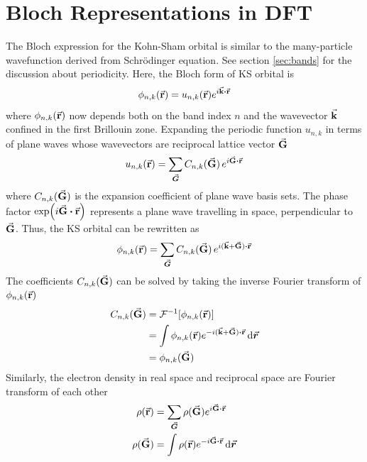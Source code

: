 \section{Bloch Representations in DFT}
The Bloch expression for the Kohn-Sham orbital is similar to the many-particle wavefunction derived from Schr\"{o}dinger equation. See section \ref{sec:bands} for the discussion about periodicity. Here, the Bloch form of KS orbital is 
\begin{equation}
    \phi_{n,k}(\va{r}) = u_{n,k} (\va{r}) e^{i \va{k} \vdot \va{r}}
\end{equation}
where $\phi_{n,k}(\va{r})$ now depends both on the band index $n$ and the wavevector $\va{k}$ confined in the first Brillouin zone. Expanding the periodic function $u_{n,k}$ in terms of plane waves whose wavevectors are reciprocal lattice vector $\va{G}$
\begin{equation}
    u_{n,k} (\va{r}) =  \sum_{\va*{G}} C_{n,k}(\va{G})\, e^{i \va{G} \vdot \va{r}}
\end{equation}
where $C_{n,k}(\va{G})$ is the expansion coefficient of plane wave basis sets. The phase factor $\exp({i \va{G} \vdot \va{r}}) $ represents a plane wave travelling in space, perpendicular to $\va{G}$. Thus, the KS orbital can be rewritten as 
\begin{equation}
    \phi_{n,k}(\va{r})  = \sum_{\va*{G}} C_{n,k}(\va{G})\, e^{i (\va{k} + \va{G} ) \vdot \va{r}}
\end{equation}
The coefficients $C_{n,k}(\va{G})$ can be solved by taking the inverse Fourier transform of $\phi_{n,k}(\va{r}) $
\begin{align}
    C_{n,k}(\va{G}) &= \mathcal{F}^{-1} [\phi_{n,k}(\va{r})] \\
            &= \int \phi_{n,k}(\va{r}) e^{- i (\va{k} + \va{G} ) \vdot \va{r}} \dd{\va*{r}} \\
            &= \phi_{n,k}(\va{G})
\end{align}
Similarly, the electron density in real space and reciprocal space are Fourier transform of each other
\begin{align}
    \rho({\va{r}}) &= \sum_{\va*{G}} \rho({\va{G}}) e^{i \va{G} \vdot \va{r}} \\
    \rho({\va{G}})  &= \int \rho({\va{r}}) e^{-i \va{G} \vdot \va{r}} \dd{\va*{r}}
\end{align}



